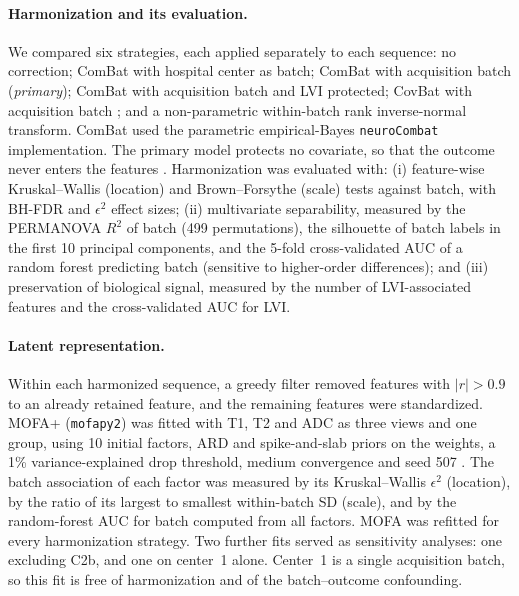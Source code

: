 \paragraph{Harmonization and its evaluation.}
We compared six strategies, each applied separately to each sequence:
no correction; ComBat with hospital center as batch; ComBat with acquisition
batch (\emph{primary}); ComBat with acquisition batch and LVI protected;
CovBat with acquisition batch \citep{chen2022covbat}; and a non-parametric
within-batch rank inverse-normal transform. ComBat used the parametric
empirical-Bayes \texttt{neuroCombat} implementation. The primary model
protects no covariate, so that the outcome never enters the features
\citep{nygaard2016methods}. Harmonization was evaluated with:
(i) feature-wise Kruskal--Wallis (location) and Brown--Forsythe (scale)
tests against batch, with BH-FDR and $\epsilon^2$ effect sizes;
(ii) multivariate separability, measured by the PERMANOVA $R^2$ of batch
(499 permutations), the silhouette of batch labels in the first 10 principal
components, and the 5-fold cross-validated AUC of a random forest predicting
batch (sensitive to higher-order differences); and
(iii) preservation of biological signal, measured by the number of
LVI-associated features and the cross-validated AUC for LVI.

\paragraph{Latent representation.}
Within each harmonized sequence, a greedy filter removed features with
$|r|>0.9$ to an already retained feature, and the remaining features were
standardized. MOFA+ (\texttt{mofapy2}) was fitted with T1, T2 and ADC as
three views and one group, using 10 initial factors, ARD and spike-and-slab
priors on the weights, a 1\% variance-explained drop threshold, medium
convergence and seed 507 \citep{argelaguet2020mofaplus}. The batch
association of each factor was measured by its Kruskal--Wallis
$\epsilon^2$ (location), by the ratio of its largest to smallest
within-batch SD (scale), and by the random-forest AUC for batch computed from
all factors. MOFA was refitted for every harmonization strategy. Two further
fits served as sensitivity analyses: one excluding C2b, and one on center~1
alone. Center~1 is a single acquisition batch, so this fit is free of
harmonization and of the batch--outcome confounding.

